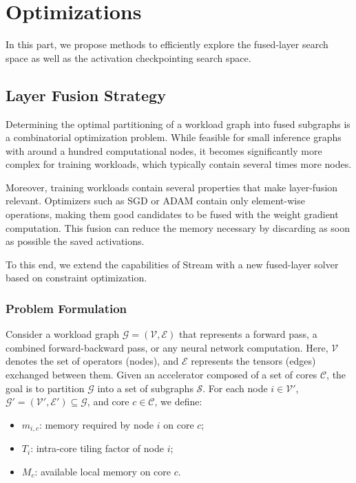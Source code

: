 \documentclass[lettersize,journal]{IEEEtran}
\begin{document}
\section{Optimizations}
In this part, we propose methods to efficiently explore the fused-layer search space as well as the activation checkpointing search space. 
\subsection{Layer Fusion Strategy}\label{pag:lfs}


Determining the optimal partitioning of a workload graph into fused subgraphs is a combinatorial optimization problem. While feasible for small inference graphs with around a hundred computational nodes, it becomes significantly more complex for training workloads, which typically contain several times more nodes.

Moreover, training workloads contain several properties that make layer-fusion relevant. Optimizers such as SGD or ADAM contain only element-wise operations, making them good candidates to be fused with the weight gradient computation. This fusion can reduce the memory necessary by discarding as soon as possible the saved activations.

To this end, we extend the capabilities of Stream with a new fused-layer solver based on constraint optimization.

\subsubsection{Problem Formulation}

Consider a workload graph \(\mathcal{G} = (\mathcal{V}, \mathcal{E})\) that represents a forward pass, a combined forward-backward pass, or any neural network computation. Here, \(\mathcal{V}\) denotes the set of operators (nodes), and \(\mathcal{E}\) represents the tensors (edges) exchanged between them. Given an accelerator composed of a set of cores \(\mathcal{C}\), the goal is to partition \(\mathcal{G}\) into a set of subgraphs \(\mathcal{S}\). 
For each node $i \in \mathcal{V}'$, $\mathcal{G}'=(\mathcal{V}', \mathcal{E}') \subseteq  \mathcal{G}$, and core $c \in \mathcal{C}$, we define:
\begin{itemize}
    \item $m_{i,c}$: memory required by node $i$ on core $c$;
    \item $T_i$: intra-core tiling factor of node $i$;
    \item $M_c$: available local memory on core $c$.
\end{itemize}
\end{document}
